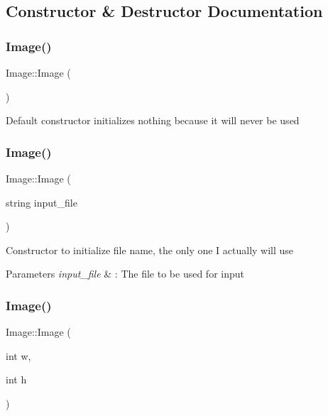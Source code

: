 \subsection{Constructor \& Destructor Documentation}
\mbox{\label{classImage_a58edd1c45b4faeb5f789b0d036d02313}} 
\subsubsection{\texorpdfstring{Image()}{Image()}\hspace{0.1cm}{\footnotesize\ttfamily [1/3]}}
{\footnotesize\ttfamily Image\+::\+Image (\begin{DoxyParamCaption}{ }\end{DoxyParamCaption})}

Default constructor initializes nothing because it will never be used \mbox{\label{classImage_af2d2b2b46060ce7d4dda966d1bb29b45}} 
\subsubsection{\texorpdfstring{Image()}{Image()}\hspace{0.1cm}{\footnotesize\ttfamily [2/3]}}
{\footnotesize\ttfamily Image\+::\+Image (\begin{DoxyParamCaption}\item[{string}]{input\+\_\+file }\end{DoxyParamCaption})}

Constructor to initialize file name, the only one I actually will use 
\begin{DoxyParams}{Parameters}
{\em input\+\_\+file} & \+: The file to be used for input \\
\hline
\end{DoxyParams}
\mbox{\label{classImage_a05c964ca59502cc32c30e8ab89b5e920}} 
\subsubsection{\texorpdfstring{Image()}{Image()}\hspace{0.1cm}{\footnotesize\ttfamily [3/3]}}
{\footnotesize\ttfamily Image\+::\+Image (\begin{DoxyParamCaption}\item[{int}]{w,  }\item[{int}]{h }\end{DoxyParamCaption})}

